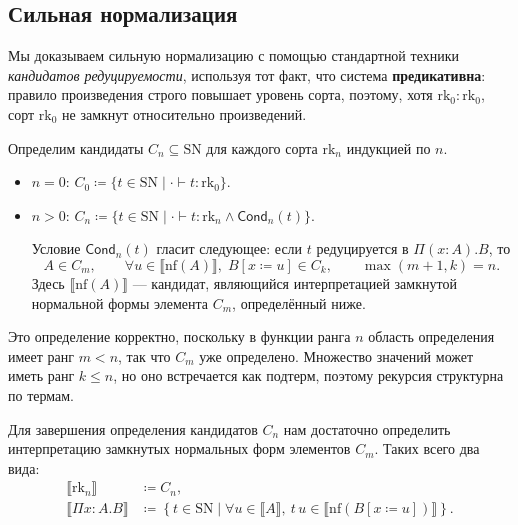 \subsection{Сильная нормализация}

Мы доказываем сильную нормализацию с помощью
стандартной техники \textit{кандидатов редуцируемости},
используя тот факт, что система \textbf{предикативна}:
правило произведения строго повышает уровень сорта,
поэтому, хотя \(\mathrm{rk}_0:\mathrm{rk}_0\), сорт
\(\mathrm{rk}_0\) не замкнут относительно произведений.

\begin{definition}
Определим кандидаты \(C_n \subseteq \mathrm{SN}\) для
каждого сорта \(\mathrm{rk}_n\) индукцией по \(n\).
\begin{itemize}
    \item \(n=0\): \(C_0 \coloneqq \{ t \in \mathrm{SN}
        \;|\; \cdot \vdash t:\mathrm{rk}_0\}\).
    \item \(n>0\): \(C_n \coloneqq \{ t \in \mathrm{SN}
        \;|\; \cdot \vdash t:\mathrm{rk}_n \land
        \mathsf{Cond}_n(t)\} \).

        Условие $\mathsf{Cond}_n(t)$ гласит следующее:
        если $t$ редуцируется в $\Pi(x:A).B$, то
        \[
            A \in C_m, \qquad
            \forall u \in \llbracket \mathrm{nf}(A)
            \rrbracket,\;B[x\coloneqq u]\in C_k, \qquad
            \max(m+1,k)=n.
        \]
        Здесь \(\llbracket \mathrm{nf}(A)\rrbracket\) —
        кандидат, являющийся интерпретацией замкнутой
        нормальной формы элемента $C_m$, определённый
        ниже.
\end{itemize}
\end{definition}

Это определение корректно, поскольку в функции ранга
\(n\) область определения имеет ранг \(m<n\), так что
\(C_m\) уже определено. Множество значений может иметь
ранг \(k\le n\), но оно встречается как подтерм,
поэтому рекурсия структурна по термам.

\begin{definition}
Для завершения определения кандидатов $C_n$ нам
достаточно определить интерпретацию замкнутых
нормальных форм элементов $C_m$. Таких всего два вида:
\begin{align*}
    \llbracket \mathrm{rk}_n \rrbracket &\coloneqq C_n,
    \\\llbracket \Pi x{:}A.B \rrbracket &\coloneqq
    \left\{ t\in\mathrm{SN} \mid
    \forall u\in \llbracket A\rrbracket,\ t\,u\in
    \llbracket \mathrm{nf}(B[x\coloneqq u])\rrbracket
    \right\}.
\end{align*}
\end{definition}

